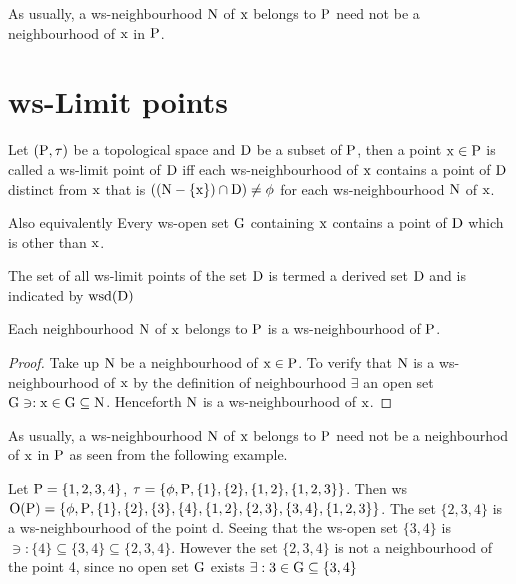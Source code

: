 \begin{rem}\label{rem2.5.5} 
As usually, a ws-neighbourhood $\mathrm{N}$ of $\mathrm{x}$ belongs to $\mathrm{P}$ need not be a neighbourhood of $\mathrm{x}$ in $\mathrm{P}$.
\end{rem}

\section{ws-Limit points}\label{sec2.6}

\begin{dfn}\label{defi2.6.1}
Let $(\mathrm{P}, \tau)$ be a topological space and $\mathrm{D}$ be a subset of $\mathrm{P}$, then a point $\mathrm{x}\in \mathrm{P}$ is called a ws-limit point of $\mathrm{D}$ iff each ws-neighbourhood of $\mathrm{x}$ contains a point of $\mathrm{D}$ distinct from $\mathrm{x}$ that is $((\mathrm{N}-\{\mathrm{x}\})\cap \mathrm{D})\neq \phi$ for each ws-neighbourhood $\mathrm{N}$ of $\mathrm{x}$.
\end{dfn}

Also equivalently Every ws-open set $\mathrm{G}$ containing $\mathrm{x}$ contains a point of $\mathrm{D}$ which is other than $\mathrm{x}$.

\begin{dfn}\label{defi2.6.2}
The set of all ws-limit points of the set $\mathrm{D}$ is termed a derived set $\mathrm{D}$ and is indicated by $\mathrm{wsd}(\mathrm{D})$
\end{dfn}

\begin{thm}\label{thm2.6.3}
Each neighbourhood $\mathrm{N}$ of $\mathrm{x}$ belongs to $\mathrm{P}$ is a ws-neighbourhood of $\mathrm{P}$.
\end{thm}

\begin{proof}
Take up $\mathrm{N}$ be a neighbourhood of $\mathrm{x}\in \mathrm{P}$. To verify that $\mathrm{N}$ is a ws-neighbourhood of $\mathrm{x}$ by the definition of neighbourhood $\exists$ an open set $\mathrm{G} \ni: \mathrm{x}\in\mathrm{G}\subseteq \mathrm{N}$. Henceforth $\mathrm{N}$ is a ws-neighbourhood of $\mathrm{x}$.
\end{proof}

\begin{rem}\label{rem2.6.4}
As usually, a ws-neighbourhood $\mathrm{N}$ of $\mathrm{x}$ belongs to $\mathrm{P}$ need not be a neighbourhod of $\mathrm{x}$ in $\mathrm{P}$ as seen from the following example.
\end{rem}

\begin{exm}\label{exam2.6.5}
Let $\mathrm{P} = \{1, 2, 3, 4 \}$, $\tau = \{\phi, \mathrm{P}, \{1\}, \{2\}, \{1, 2\}, \{1, 2, 3\}\}$. Then ws$\mathrm{O}(\mathrm{P})= \{\phi, \mathrm{P}, \{1\}, \{2\}, \{3\}, \{4\},\{1, 2\},\{2, 3\}, \{3, 4\}, \{1, 2, 3\}\}$. The set $\{2, 3, 4\}$ is a ws-neighbourhood of the point d. Seeing that the ws-open set $\{3, 4\}$ is $\ni: \{4\}\subseteq \{3, 4\} \subseteq \{2, 3, 4\}$. However the set $\{2, 3, 4\}$ is not a neighbourhood of the point 4, since no open set $\mathrm{G}$ exists $\exists: 3\in \mathrm{G}\subseteq \{3, 4\}$
\end{exm}




